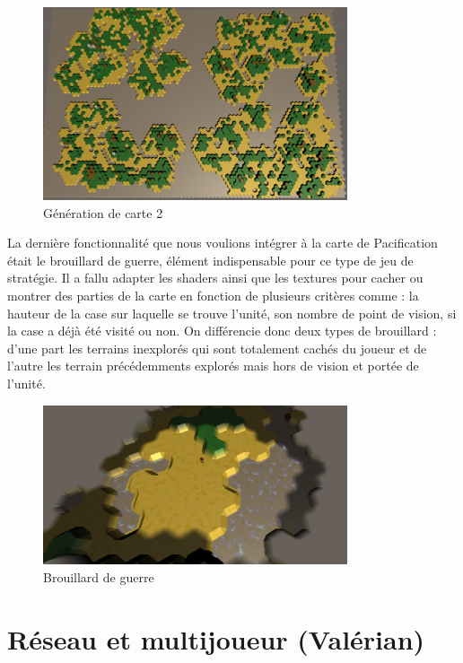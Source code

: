 \documentclass[12pt]{report}
\begin{document}
\begin{figure}[H]
    \centering
    \includegraphics[width=0.8\textwidth]{MapGen2}
    \caption{Génération de carte 2}
\end{figure}

La dernière fonctionnalité que nous voulions intégrer à la carte de Pacification
était le brouillard de guerre, élément indispensable pour ce type de jeu de
stratégie. Il a fallu adapter les shaders ainsi que les textures pour cacher ou
montrer des parties de la carte en fonction de plusieurs critères comme : la
hauteur de la case sur laquelle se trouve l'unité, son nombre de point de
vision, si la case a déjà été visité ou non. On différencie donc deux types de
brouillard : d'une part les terrains inexplorés qui sont totalement cachés du
joueur et de l'autre les terrain précédemments explorés mais hors de vision et
portée de l'unité.

\begin{figure}[H]
    \centering
    \includegraphics[width=0.8\textwidth]{FogOfWar}
    \caption{Brouillard de guerre}
\end{figure}

\section{Réseau et multijoueur (Valérian)}
\end{document}
